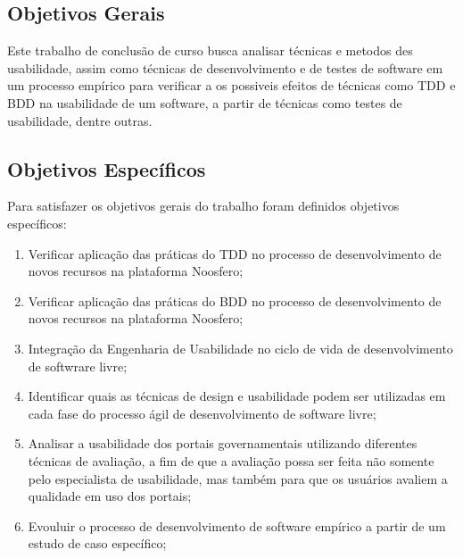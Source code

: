 	\subsection{Objetivos Gerais}
	 
	Este trabalho de conclusão de curso busca analisar técnicas e metodos des usabilidade, assim como técnicas de desenvolvimento e de testes de software em um processo empírico para verificar a os possiveis efeitos de técnicas como TDD e BDD na usabilidade de um software, a partir de técnicas como testes de usabilidade, dentre outras.
	
	 
	 
	\subsection{Objetivos Específicos}

	 Para satisfazer os objetivos gerais do trabalho foram definidos objetivos específicos:

	\begin{enumerate}
	\item Verificar aplicação das práticas do TDD no processo de desenvolvimento de novos recursos na plataforma Noosfero;
	\item Verificar aplicação das práticas do BDD no processo de desenvolvimento de novos recursos na plataforma Noosfero;
	\item Integração da Engenharia de Usabilidade no ciclo de vida de desenvolvimento de softwrare livre;
	\item Identificar quais as técnicas de design e usabilidade  podem ser utilizadas em cada fase do processo ágil de desenvolvimento de software livre;
	\item Analisar a usabilidade dos portais governamentais utilizando diferentes técnicas de avaliação, a fim de que a avaliação possa ser feita não somente pelo especialista de usabilidade, mas também para que os usuários avaliem a qualidade em uso dos portais;
	\item Evouluir o processo de desenvolvimento de software empírico a partir de um estudo de caso específico;
	\end{enumerate}

